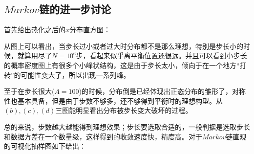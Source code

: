 \documentclass[UTF8]{ctexart}
\begin{document}
\begin{flushleft}
		
	\section{$Markov$链的进一步讨论}
		
	\begin{flushleft}
			\begin{flushleft}
				首先给出热化之后的$x$分布直方图：
			\end{flushleft}
	
	\begin{flushleft}
		\qquad 从图上可以看出，当步长过小或者过大时分布都不是那么理想，特别是步长小的时候，就算用尽了$N=10^{6}$步，看起来似乎离平衡位置还很远。并且可以看到小步长的概率密度图上有很多个小峰状结构，这是由于步长太小，倾向于在一个地方“打转”的可能性变大了，所以出现一系列峰。	
		
		\qquad 至于在步长很大($A=100$)的时候，分布倒是已经体现出正态分布的雏形了，对称性也基本具备，但是由于步数不够多，还不够得到平衡时的理想构型。从$(b),(c),(d)$三图能明显看出分布被步长变大破坏的过程。
		
		\qquad 总的来说，步数越大越能得到理想效果；步长要选取合适的，一般判据是选取步长和数据方差在一个数量级，这样得到的收敛速度快，精度高。对于$Markov$链直观的可视化抽样图如下给出：
		
	\end{flushleft}	
			

\end{flushleft}
\end{flushleft}
\end{document}
